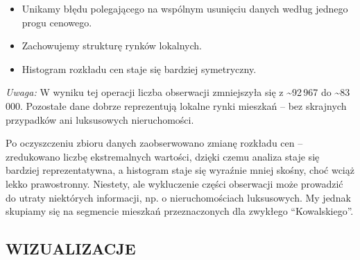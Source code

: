 \documentclass[11pt]{article}
\providecommand{\tightlist}{%
      \setlength{\itemsep}{0pt}\setlength{\parskip}{0pt}}
\begin{document}
\begin{itemize}
\tightlist
\item
  Unikamy błędu polegającego na wspólnym usunięciu danych według jednego
  progu cenowego.
\item
  Zachowujemy strukturę rynków lokalnych.
\item
  Histogram rozkładu cen staje się bardziej symetryczny.
\end{itemize}

\emph{Uwaga:} W wyniku tej operacji liczba obserwacji zmniejszyła się z
\textasciitilde92\,967 do \textasciitilde83\,000. Pozostałe dane dobrze
reprezentują lokalne rynki mieszkań -- bez skrajnych przypadków ani
luksusowych nieruchomości.

Po oczyszczeniu zbioru danych zaobserwowano zmianę rozkładu cen --
zredukowano liczbę ekstremalnych wartości, dzięki czemu analiza staje
się bardziej reprezentatywna, a histogram staje się wyraźnie mniej
skośny, choć wciąż lekko prawostronny. Niestety, ale wykluczenie części
obserwacji może prowadzić do utraty niektórych informacji, np. o
nieruchomościach luksusowych. My jednak skupiamy się na segmencie
mieszkań przeznaczonych dla zwykłego ``Kowalskiego''.

    \subsection{WIZUALIZACJE}\label{wizualizacje}
\end{document}
